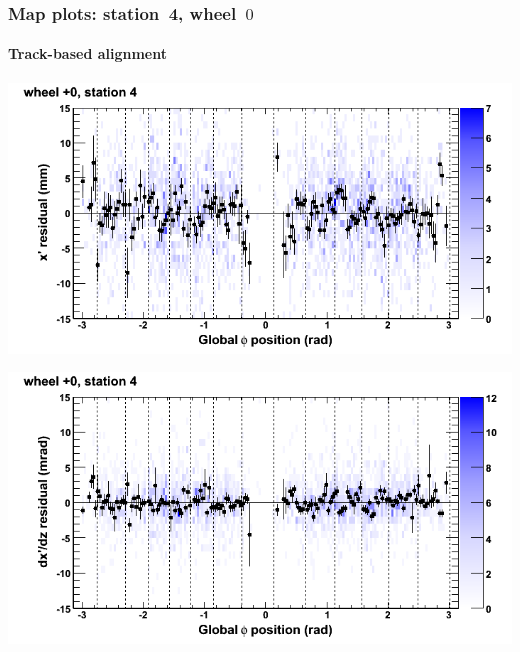 \documentclass[compress]{beamer}
\begin{document}
\begin{frame}
\frametitle{Map plots: station~4, wheel~$0$}
\framesubtitle{Track-based alignment}
\includegraphics[width=0.5\linewidth]{mapplots_re05/DTvsphi_st4whC_x.png}

\includegraphics[width=0.5\linewidth]{mapplots_re05/DTvsphi_st4whC_dxdz.png}
\end{frame}
\end{document}
